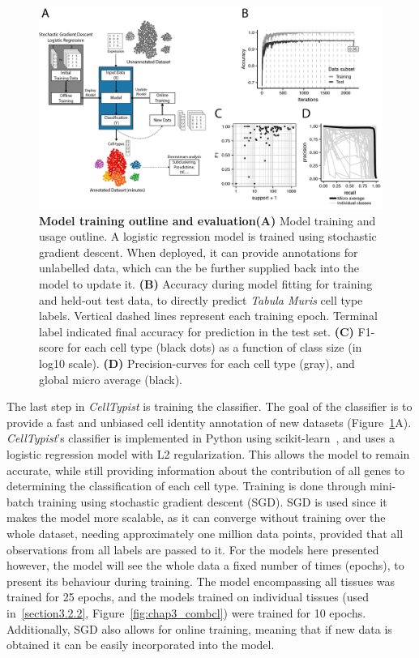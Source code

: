 \begin{figure}[ht!]
    \centering
    \includegraphics[width=1.0\textwidth]{Chapter3/Figs/chap3_model.png} %
    \caption[Model training outline and evaluation]{\textbf{Model training outline and evaluation}\newline\textbf{(A)} Model training and usage outline. A logistic regression model is trained using stochastic gradient descent. When deployed, it can provide annotations for unlabelled data, which can the be further supplied back into the model to update it. \textbf{(B)} Accuracy during model fitting for training and held-out test data, to directly predict \textit{Tabula Muris} cell type labels. Vertical dashed lines represent each training epoch. Terminal label indicated final accuracy for prediction in the test set. \textbf{(C)} F1-score for each cell type (black dots) as a function of class size (in log10 scale). \textbf{(D)} Precision-curves for each cell type (gray), and global micro average (black).}
    \label{fig:chap3_model}
\end{figure}

The last step in \textit{CellTypist} is training the classifier. The goal of the classifier is to provide a fast and unbiased cell identity annotation of new datasets (Figure~\ref{fig:chap3_model}A). \textit{CellTypist}'s classifier is implemented in Python using scikit-learn~\citep{scikit-learn}, and uses a logistic regression model with L2 regularization. This allows the model to remain accurate, while still providing information about the contribution of all genes to determining the classification of each cell type. Training is done through mini-batch training using stochastic gradient descent (SGD). SGD is used since it makes the model more scalable, as it can converge without training over the whole dataset, needing approximately one million data points, provided that all observations from all labels are passed to it. For the models here presented however, the model will see the whole data a fixed number of times (epochs), to present its behaviour during training. The model encompassing all tissues was trained for 25 epochs, and the models trained on individual tissues (used in~\ref{section3.2.2}, Figure~\ref{fig:chap3_combcl}) were trained for 10 epochs. Additionally, SGD also allows for online training, meaning that if new data is obtained it can be easily incorporated into the model.

